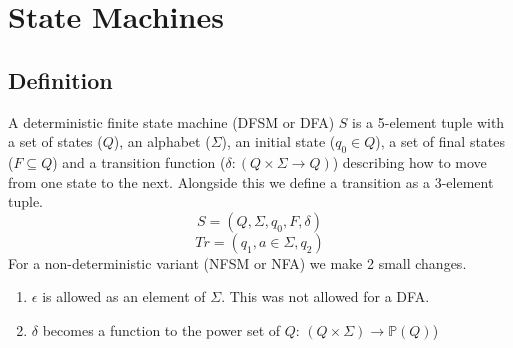 \pagebreak

\section{State Machines}
	\subsection{Definition}
		A deterministic finite state machine (DFSM or DFA) $S$ is a 5-element tuple with a set of states ($Q$), an alphabet ($\Sigma$), an initial state ($q_0 \in Q$), a set of final states ($F \subseteq Q$) and a transition function ($\delta : (Q \times \Sigma \rightarrow Q)$) describing how to move from one state to the next. Alongside this we define a transition as a 3-element tuple.
		\begin{equation} S = (Q, \Sigma, q_0, F, \delta) \end{equation}
		\begin{equation} Tr = (q_1, a \in \Sigma, q_2) \end{equation}
		For a non-deterministic variant (NFSM or NFA) we make 2 small changes. 
		\begin{enumerate}
			\item $\epsilon$ is allowed as an element of $\Sigma$. This was not allowed for a DFA.
			\item $\delta$ becomes a function to the power set of $Q$: $(Q \times \Sigma) \rightarrow \mathbb{P}(Q)$)
		\end{enumerate}
			
